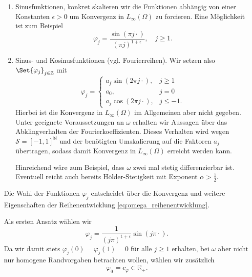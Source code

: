 \begin{enumerate}
    \item Sinusfunktionen, konkret skalieren wir die Funktionen abhängig von einer Konstanten $\epsilon > 0$ um Konvergenz in $L_{\infty}(\Omega)$ zu forcieren.
    Eine Möglichkeit ist zum Beispiel
    \begin{equation}
        \varphi_{j} = \frac{\sin(\pi j \cdot)}{(\pi j)^{1 + \epsilon}}, \quad j \geq 1.
    \end{equation}
    \item Sinus- und Kosinusfunktionen (vgl. Fourierreihen).
    Wir setzen also $\Set{ \varphi_{j} }_{j \in \mathbb{Z}}$ mit
    \begin{equation}
        \varphi_{j} = \begin{cases}
            a_{j} \sin(2 \pi j \cdot),    &j \geq 1 \\
            a_{0},                      &j = 0 \\
            a_{j} \cos(2 \pi j \cdot),    &j \leq -1.
        \end{cases}
    \end{equation}
    Hierbei ist die Konvergenz in $L_{\infty}(\Omega)$ im Allgemeinen aber nicht gegeben.
    Unter geeignete Voraussetzungen an $\omega$ erhalten wir Aussagen über das Abklingverhalten der Fourierkoeffizienten.
    Dieses Verhalten wird wegen $\mathcal S = [-1, 1]^{\mathbb{N}}$ und der benötigten Umskalierung auf die Faktoren $a_{j}$ übertragen, sodass damit Konvergenz in $L_{\infty}(\Omega)$ erreicht werden kann.

    Hinreichend wäre zum Beispiel, dass $\omega$ zwei mal stetig differenzierbar ist.
    Eventuell reicht auch bereits Hölder-Stetigkeit mit Exponent $\alpha > \frac{1}{2}$.
\end{enumerate}

Die Wahl der Funktionen $\varphi_{j}$ entscheidet über die Konvergenz und weitere Eigenschaften der Reihenentwicklung \eqref{eq:omega_reihenentwicklung}.

Als ersten Ansatz wählen wir
\begin{equation}
    \varphi_{j} = \frac{1}{(j \pi)^{1 + \epsilon}} \sin(j \pi \cdot).
\end{equation}
Da wir damit stets $\varphi_{j}(0) = \varphi_{j}(1) = 0$ für alle $j \geq 1$ erhalten, bei $\omega$ aber nicht nur homogene Randvorgaben betrachten wollen, wählen wir zusätzlich
\begin{equation}
    \label{eq:entwicklung_phi_0_konstante}
    \varphi_{0} = c_{\varphi} \in \mathbb{R}_{+}.
\end{equation}

